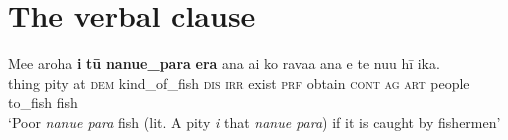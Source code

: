 \chapter[The verbal clause]{The verbal clause}\label{ch:8}
\ea\label{ex:4.258}
\gll Me{\ꞌ}e {\ꞌ}aroha \textbf{i} \textbf{tū} \textbf{nanue\_para} \textbf{era} ana ai ko rava{\ꞌ}a {\ꞌ}ana e te nu{\ꞌ}u  hī ika.\\
thing pity at \textsc{dem} kind\_of\_fish \textsc{dis} \textsc{irr} exist \textsc{prf} obtain \textsc{cont} \textsc{ag} \textsc{art} people to\_fish fish\\

\glt
‘Poor \textit{nanue para} fish (lit. A pity \textit{i} that \textit{nanue para}) if it is caught by fishermen’ \textstyleExampleref{[R301.320]} 
\z


